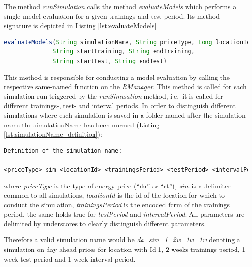 The method \textit{runSimulation} calls the method \textit{evaluateModels} which performs a single model evaluation for a given trainings and test period. Its method signature is depicted in Listing \ref{lst:evaluateModels}. 

\begin{minipage}{\linewidth}
\begin{lstlisting}[language=Java, caption=Method evaluateModels, label={lst:evaluateModels}]
evaluateModels(String simulationName, String priceType, Long locationId, 
              String startTraining, String endTraining,
              String startTest, String endTest)
\end{lstlisting}
\end{minipage}

This method is responsible for conducting a model evaluation by calling the respective same-named function on the \textit{RManager}. This method is called for each simulation run triggered by the \textit{runSimulation} method, i.e.~it is called for different trainings-, test- and interval periods. In order to distinguish different simulations where each simulation is saved in a folder named after the simulation name the simulationName has been normed (Listing \ref{lst:simulationName_definition}): 

\begin{minipage}{\linewidth}
\begin{lstlisting}[caption=Definition of the simulation name, label={lst:simulationName_definition}]
Definition of the simulation name: 
	
<priceType>_sim_<locationId>_<trainingsPeriod>_<testPeriod>_<intervalPeriod>
\end{lstlisting}
\end{minipage}

where \textit{priceType} is the type of energy price (``da'' or ``rt''), \textit{sim} is a delimiter common to all simulations, \textit{locationId} is the id of the location for which to conduct the simulation, \textit{trainingsPeriod} is the encoded form of the trainings period, the same holds true for \textit{testPeriod} and \textit{intervalPeriod}. All parameters are delimited by underscores to clearly distinguish different parameters. 

Therefore a valid simulation name would be \textit{da\_sim\_1\_2w\_1w\_1w} denoting a simulation on day ahead prices for location with Id 1, 2 weeks trainings period, 1 week test period and 1 week interval period. 

